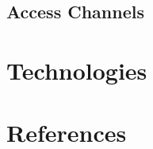 \documentclass[a4paper,12pt]{article}
\begin{document}
		\subsection{Access Channels}
		

	\section{Technologies}
	
	
	
	\section{References}
	
	
\end{document}
